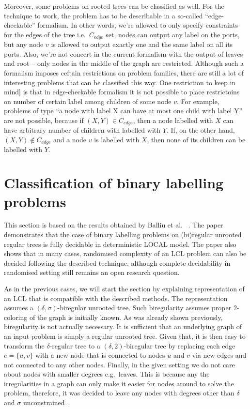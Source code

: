Moreover, some problems on rooted trees can be classified as well. For the technique to work, the problem
has to be describable in a so-called ``edge-checkable'' formalism. In other words, we're allowed to
only specify constraints for the edges of the tree i.e.\ $C_{edge}$ set, nodes can output any label
on the ports, but any node $v$ is allowed to output exactly one and the same label on all its ports.
Also, we're not concert in the current formalism with the output of leaves and root -- only nodes in the
middle of the graph are restricted. Although such a formalism imposes ceftain restrictions on problem families,
there are still a lot of interesting problems that can be classified this way. One restriction to keep in mind]
is that in edge-checkable formalism it is not possible to place restrictoins on number of certain label
among children of some node $v$. For example, problems of type ``a node with label X can have at most one child with label Y''
are not possible, because if $(X, Y) \in C_{edge}$, then a node labelled with $X$ can have arbitrary number of children
with labelled with $Y$. If, on the other hand, $(X, Y) \notin C_{edge}$ and a node $v$ is labelled with $X$, then
none of its children can be labelled with $Y$.

\section{Classification of binary labelling problems}

This section is based on the results obtained by Balliu et al. ~\cite{Balliu2019c}. The paper demonstrates
that the case of binary labelling problems on (bi)regular unrooted regular trees is fully decidable in
deterministic LOCAL model. The paper also shows that in many cases, randomised complexity of an LCL problem
can also be decided following the described technique, although complete decidability in randomised setting
still remains an open research question.

As in the previous cases, we will start the section by explaining representation of an LCL that is compatible
with the described methods. The representation assumes a $(\delta, \sigma)$-biregular unrooted tree.
Such biregularity assumes proper 2-coloring of the graph is initially known.
As was already shown previously, biregularity is not actually necessary. It is
sufficient that an underlying graph of an input problem is simply a regular
unrooted tree. Given that, it is then easy to transform the $\delta$-regular tree
to a $(\delta, 2)$-biregular tree by replacing each edge $e = \{u, v\}$ with a new node that is
connected to nodes $u$ and $v$ via new edges and not connected to any other nodes. Finally,
in the given setting we do not care about nodes with smaller degrees e.g.\ leaves. This is
because any the irregularities in a graph can only make it easier for nodes around to solve
the problem, therefore, it was decided to leave any nodes with degrees other than $\delta$
and $\sigma$ unconstrained~\cite{Balliu2019c}.

